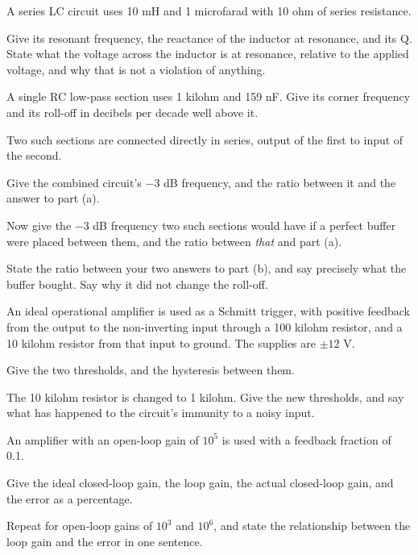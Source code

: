  A series LC circuit uses 10 mH and 1 microfarad with 10 ohm of series resistance.

Give its resonant frequency, the reactance of the inductor at resonance, and its Q. State what the voltage across the inductor is at resonance, relative to the applied voltage, and why that is not a violation of anything.

\label{exa:q:3}

 A single RC low-pass section uses 1 kilohm and 159 nF. Give its corner frequency and its roll-off in decibels per decade well above it.

 Two such sections are connected directly in series, output of the first to input of the second.

Give the combined circuit's $-3$ dB frequency, and the ratio between it and the answer to part (a).

Now give the $-3$ dB frequency two such sections would have if a perfect buffer were placed between them, and the ratio between \emph{that} and part (a).

 State the ratio between your two answers to part (b), and say precisely what the buffer bought. Say why it did not change the roll-off.

 An ideal operational amplifier is used as a Schmitt trigger, with positive feedback from the output to the non-inverting input through a 100 kilohm resistor, and a 10 kilohm resistor from that input to ground. The supplies are $\pm 12$ V.

Give the two thresholds, and the hysteresis between them.

The 10 kilohm resistor is changed to 1 kilohm. Give the new thresholds, and say what has happened to the circuit's immunity to a noisy input.

\label{exa:q:4}

 An amplifier with an open-loop gain of $10^5$ is used with a feedback fraction of 0.1.

Give the ideal closed-loop gain, the loop gain, the actual closed-loop gain, and the error as a percentage.

Repeat for open-loop gains of $10^3$ and $10^6$, and state the relationship between the loop gain and the error in one sentence.

